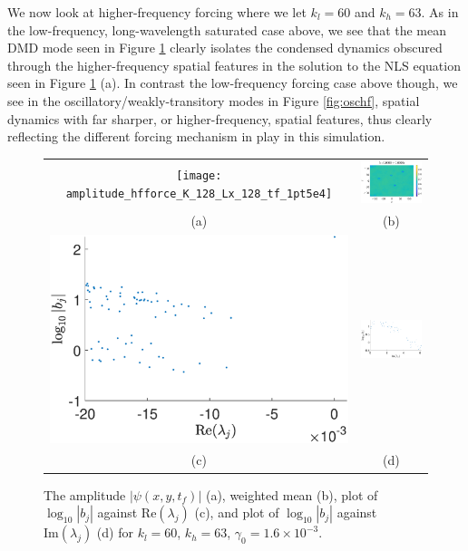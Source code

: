 \documentclass[a4paper,11pt]{article}
\begin{document}
We now look at higher-frequency forcing where we let $k_{l}=60$ and $k_{h}=63$.  As in the low-frequency, long-wavelength saturated case above, we see that the mean DMD mode seen in Figure \ref{fig:ampcomphf} clearly isolates the condensed dynamics obscured through the higher-frequency spatial features in the solution to the NLS equation seen in Figure \ref{fig:ampcomphf} (a).  In contrast the low-frequency forcing case above though, we see in the oscillatory/weakly-transitory modes in Figure \ref{fig:oschf}, spatial dynamics with far sharper, or higher-frequency, spatial features, thus clearly reflecting the different forcing mechanism in play in this simulation.   
\begin{figure}[!ht]
\centering
\begin{tabular}{cc}
\texttt{[image: amplitude\_hfforce\_K\_128\_Lx\_128\_tf\_1pt5e4]} &\hspace{-15pt} \includegraphics[width=.51\textwidth]{mean_hfforce_K_128_Lx_128_tf_1_pt5e4} \\
(a) & (b)\\
\includegraphics[width=.51\textwidth]{bvals_vs_real_lam_hfforce_K_128_Lx_128_tf_1_pt5e4} &\hspace{-15pt} \includegraphics[width=.51\textwidth]{bvals_vs_imag_lam_hfforce_K_128_Lx_128_tf_1_pt5e4}\\
(c) & (d)
\end{tabular}
\caption{The amplitude $\left|\psi(x,y,t_{f})\right|$ (a), weighted mean (b),  plot of $\log_{10}|b_{j}|$ against $\mbox{Re}(\lambda_{j})$ (c), and plot of $\log_{10}|b_{j}|$ against $\mbox{Im}(\lambda_{j})$ (d) for $k_{l}=60$, $k_{h}=63$, $\gamma_{0}=1.6\times 10^{-3}$. }
\label{fig:ampcomphf}
\end{figure}
\end{document}
